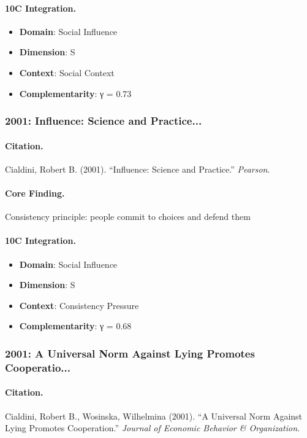 \paragraph{10C Integration.}
\begin{itemize}[nosep]
  \item \textbf{Domain}: Social Influence
  \item \textbf{Dimension}: S
  \item \textbf{Context}: Social Context
  \item \textbf{Complementarity}: γ = 0.73
\end{itemize}

\subsubsection{2001: Influence: Science and Practice...}

\paragraph{Citation.}
Cialdini, Robert B. (2001). ``Influence: Science and Practice.''
\textit{Pearson}.

\paragraph{Core Finding.}
Consistency principle: people commit to choices and defend them

\paragraph{10C Integration.}
\begin{itemize}[nosep]
  \item \textbf{Domain}: Social Influence
  \item \textbf{Dimension}: S
  \item \textbf{Context}: Consistency Pressure
  \item \textbf{Complementarity}: γ = 0.68
\end{itemize}

\subsubsection{2001: A Universal Norm Against Lying Promotes Cooperatio...}

\paragraph{Citation.}
Cialdini, Robert B., Wosinska, Wilhelmina (2001). ``A Universal Norm Against Lying Promotes Cooperation.''
\textit{Journal of Economic Behavior & Organization}.

